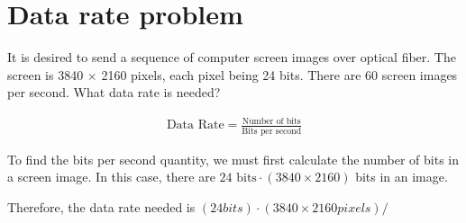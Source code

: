 
\section{Data rate problem}
It is desired to send a sequence of computer screen images over optical fiber. The screen is 3840 $\times$ 2160 pixels, each pixel being 24 bits. There are 60 screen images per second. What data rate is needed?

\begin{align*}
	\text{Data Rate} = \frac{\text{Number of bits}}{\text{Bits per second}}
\end{align*}

To find the bits per second quantity, we must first calculate the number of bits in a screen image. In this case, there are $24 \text{ bits} \cdot (3840 \times 2160)$ bits in an image.

Therefore, the data rate needed is $(24 bits) \cdot (3840 \times 2160 pixels) / $

\section{}
\section{}
\section{}
\section{}
\section{}
\section{}
